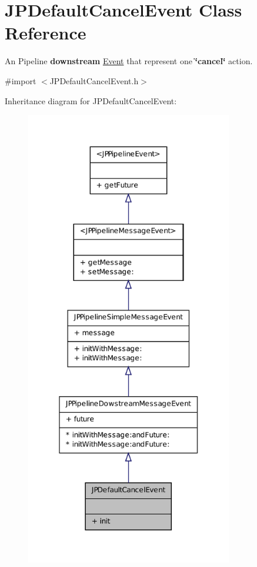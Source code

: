 \hypertarget{a00010}{
\section{JPDefaultCancelEvent Class Reference}
\label{a00010}
}


An Pipeline {\bfseries downstream} \hyperlink{a00005}{Event} that represent one {\bfseries \char`\"{}cancel\char`\"{}} action.  




{\ttfamily \#import $<$JPDefaultCancelEvent.h$>$}



Inheritance diagram for JPDefaultCancelEvent:\nopagebreak
\begin{figure}[H]
\begin{center}
\leavevmode
\includegraphics[width=256pt]{a00091}
\end{center}
\end{figure}



